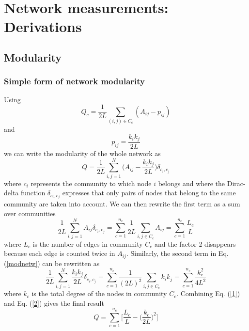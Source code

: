 \documentclass[11 pt , letterpaper , twoside , openright]{book}
\begin{document}


\newpage

\appendix
\chapter{Network measurements: Derivations}
\section{Modularity}\label{modul}
\subsection{Simple form of network modularity}\label{simplemod}

Using \cite{Albert2016}
\begin{equation}
	Q_c = \frac{1}{2L}\sum_{(i,j) \in C_c} (A_{ij} - p_{ij})
\end{equation}
and \cite{Albert2016}
\begin{equation}
	p_{ij} = \frac{k_ik_j}{2L}
\end{equation}
we can write the modularity of the whole network as \cite{Albert2016}
\begin{equation}\label{modnetw}
	Q = \frac{1}{2L}\sum_{i, j = 1}^N \bigg(A_{ij} - \frac{k_ik_j}{2L}\bigg) \delta_{c_i, c_j}
\end{equation}
where $c_i$ represents the community to which node $i$ belongs and where the Dirac-delta function $\delta_{c_i, c_j}$ expresses that only pairs of nodes that belong to the same community are taken into account. We can then rewrite the first term as a sum over communities \cite{Albert2016}
\begin{equation}\label{1}
	\frac{1}{2L}\sum_{i, j = 1}^N A_{ij}\delta_{c_i, c_j} = \sum_{c=1}^{n_c}\frac{1}{2L}\sum_{i, j \in C_c} A_{ij} = \sum_{c=1}^{n_c}\frac{L_c}{L}
\end{equation}
where $L_c$ is the number of edges in community $C_c$ and the factor 2 disappears because each edge is counted twice in $A_{ij}$. Similarly, the second term in Eq. (\ref{modnetw}) can be rewritten as \cite{Albert2016}
\begin{equation}\label{2}
	\frac{1}{2L}\sum_{i, j = 1}^N \frac{k_ik_j}{2L} \delta_{c_i, c_j} = \sum_{c=1}^{n_c}\frac{1}{(2L)^2}\sum_{i, j \in C_c} k_ik_j = \sum_{c=1}^{n_c}\frac{k_c^2}{4L^2}
\end{equation}
where $k_c$ is the total degree of the nodes in community $C_c$. Combining Eq. (\ref{1}) and Eq. (\ref{2}) gives the final result \cite{Albert2016}
\begin{equation}\label{Qfin}
	Q = \sum_{c = 1}^{n_c}\bigg[\frac{L_c}{L} - \bigg(\frac{k_c}{2L}\bigg)^2 \bigg]
\end{equation}
\end{document}
